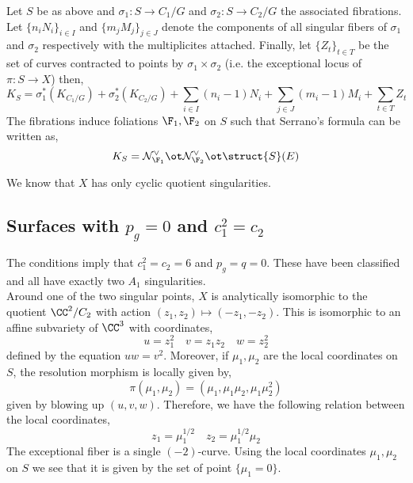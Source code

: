 \documentclass[12pt]{article}
\newcommand{\cN}{\mathcal{N}}
\begin{document}
\begin{theorem}
Let $S$ be as above and $\sigma_1 : S \to C_1 / G$ and $\sigma_2 : S \to C_2 / G$ the associated fibrations. Let $\{ n_i N_i \}_{i \in I}$ and $\{ m_j M_j \}_{j \in J}$ denote the components of all singular fibers of $\sigma_1$ and $\sigma_2$ respectively with the multiplicites attached. Finally, let $\{ Z_t \}_{t \in T}$ be the set of curves contracted to points by $\sigma_1 \times \sigma_2$ (i.e. the exceptional locus of $\pi : S \to X$) then,
\[ K_S = \sigma_1^* (K_{C_1/G}) + \sigma_2^*(K_{C_2 / G}) + \sum_{i \in I} (n_i - 1)N_i + \sum_{j \in J} (m_i - 1) M_i + \sum_{t \in T} Z_t \]
The fibrations induce foliations $\F_1, \F_2$ on $S$ such that Serrano's formula can be written as,
\[ K_S = \cN_{\F_1}^\vee \ot \cN_{\F_2}^\vee \ot \struct{S}(E) \]
\end{theorem}


\begin{center}
\end{center}
We know that $X$ has only cyclic quotient singularities. 

\subsection{Surfaces with $p_g = 0$ and $c_1^2 = c_2$}

The conditions imply that $c_1^2 = c_2 = 6$ and $p_g = q = 0$. These have been classified and all have exactly two $A_1$ singularities.
\bigskip\\
Around one of the two singular points, $X$ is analytically isomorphic to the quotient $\CC^2 / C_2$ with action $(z_1, z_2) \mapsto (-z_1, -z_2)$. This is isomorphic to an affine subvariety of $\CC^3$ with coordinates,
\[ u = z_1^2 \quad v = z_1 z_2 \quad w = z_2^2 \]
defined by the equation $uw  =  v^2$. Moreover, if $\mu_1, \mu_2$ are the local coordinates on $S$, the resolution morphism is locally given by,
\[ \pi(\mu_1, \mu_2) = (\mu_1, \mu_1 \mu_2, \mu_1 \mu_2^2) \]
given by blowing up $(u,v,w)$. Therefore, we have the following relation between the local coordinates,
\[ z_1 = \mu_1^{1/2} \quad z_2 = \mu_1^{1/2} \mu_2 \]
The exceptional fiber is a single $(-2)$-curve. Using the local coordinates $\mu_1, \mu_2$ on $S$ we see that it is given by the set of point $\{ \mu_1 = 0 \}$. 
\end{document}
